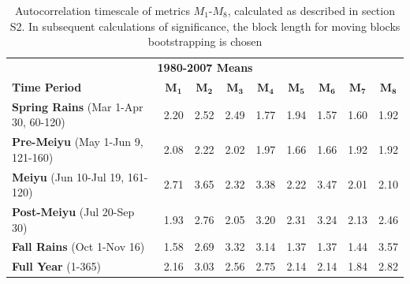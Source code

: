 \begin{table}[p]

\centering

\caption{Autocorrelation timescale of metrics $M_1$-$M_8$, calculated as described in section S2. In subsequent calculations of significance, the block length for moving blocks bootstrapping is chosen}

\begin{tabular}{ l c c c c c c c c}
	 \multicolumn{9}{c}{\textbf{1980-2007 Means}} \\
	 \textbf{Time Period} 						& $\boldsymbol{M_1}$ & $\boldsymbol{M_2}$ & $\boldsymbol{M_3}$ & $\boldsymbol{M_4}$ & $\boldsymbol{M_5}$ & $\boldsymbol{M_6}$ & $\boldsymbol{M_7}$ & $\boldsymbol{M_8}$ \\	 \hline
	 \hline
	\textbf{Spring Rains} (Mar 1-Apr 30, 60-120) 	& 2.20 & 2.52 & 2.49 & 1.77 & 1.94 & 1.57 & 1.60 & 1.92 \\
	\textbf{Pre-Meiyu} (May 1-Jun 9, 121-160) 		& 2.08 & 2.22 & 2.02 & 1.97 & 1.66 & 1.66 & 1.92 & 1.92 \\		
	\textbf{Meiyu} (Jun 10-Jul 19, 161-120) 		& 2.71 & 3.65 & 2.32 & 3.38 & 2.22 & 3.47 & 2.01 & 2.10 \\
	\textbf{Post-Meiyu} (Jul 20-Sep 30) 			& 1.93 & 2.76 & 2.05 & 3.20 & 2.31 & 3.24 & 2.13 & 2.46 \\
	\textbf{Fall Rains} (Oct 1-Nov 16) 				& 1.58 & 2.69 & 3.32 & 3.14 & 1.37 & 1.37 & 1.44 & 3.57 \\
	\textbf{Full Year} (1-365)	 				& 2.16 & 3.03 & 2.56 & 2.75 & 2.14 & 2.14 & 1.84 & 2.82 \\
\end{tabular}
\label{ts11}
\end{table}


